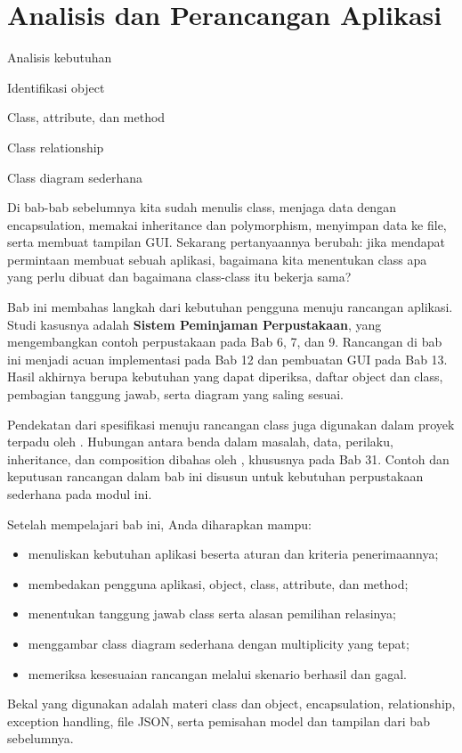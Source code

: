 \chapter{Analisis dan Perancangan Aplikasi}

\begingroup
\ifPDFTeX\else
\fi

\begin{dibabini}
  \item Analisis kebutuhan
  \item Identifikasi object
  \item Class, attribute, dan method
  \item Class relationship
  \item Class diagram sederhana
\end{dibabini}

Di bab-bab sebelumnya kita sudah menulis class, menjaga data dengan encapsulation, memakai inheritance dan polymorphism, menyimpan data ke file, serta membuat tampilan GUI. Sekarang pertanyaannya berubah: jika mendapat permintaan membuat sebuah aplikasi, bagaimana kita menentukan class apa yang perlu dibuat dan bagaimana class-class itu bekerja sama?

Bab ini membahas langkah dari kebutuhan pengguna menuju rancangan aplikasi. Studi kasusnya adalah \textbf{Sistem Peminjaman Perpustakaan}, yang mengembangkan contoh perpustakaan pada Bab 6, 7, dan 9. Rancangan di bab ini menjadi acuan implementasi pada Bab 12 dan pembuatan GUI pada Bab 13. Hasil akhirnya berupa kebutuhan yang dapat diperiksa, daftar object dan class, pembagian tanggung jawab, serta diagram yang saling sesuai.

Pendekatan dari spesifikasi menuju rancangan class juga digunakan dalam proyek terpadu oleh \cite{north2025oop}. Hubungan antara benda dalam masalah, data, perilaku, inheritance, dan composition dibahas oleh \cite{lutz2025learning}, khususnya pada Bab 31. Contoh dan keputusan rancangan dalam bab ini disusun untuk kebutuhan perpustakaan sederhana pada modul ini.

\begin{info}
Setelah mempelajari bab ini, Anda diharapkan mampu:
\begin{itemize}
  \item menuliskan kebutuhan aplikasi beserta aturan dan kriteria penerimaannya;
  \item membedakan pengguna aplikasi, object, class, attribute, dan method;
  \item menentukan tanggung jawab class serta alasan pemilihan relasinya;
  \item menggambar class diagram sederhana dengan multiplicity yang tepat;
  \item memeriksa kesesuaian rancangan melalui skenario berhasil dan gagal.
\end{itemize}
Bekal yang digunakan adalah materi class dan object, encapsulation, relationship, exception handling, file JSON, serta pemisahan model dan tampilan dari bab sebelumnya.
\end{info}

